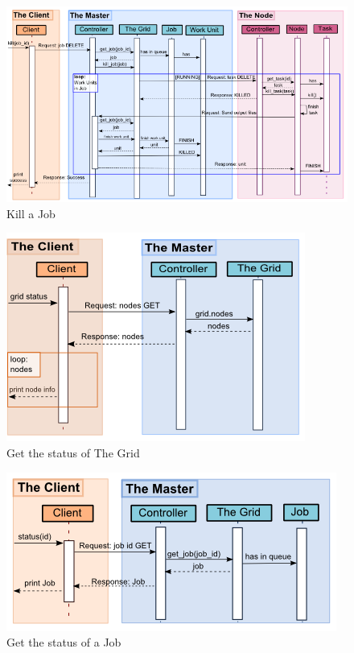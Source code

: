 \begin{figure}[htbp]
\centering
\includegraphics[keepaspectratio,width=\textwidth,height=0.75\textheight]{./figs/jobkill.png}
\caption{Kill a Job}
\end{figure}


\begin{figure}[htbp]
\centering
\includegraphics[keepaspectratio,width=\textwidth,height=0.75\textheight]{./figs/gridstatus.png}
\caption{Get the status of The Grid}
\end{figure}


\begin{figure}[htbp]
\centering
\includegraphics[keepaspectratio,width=\textwidth,height=0.75\textheight]{./figs/jobget.png}
\caption{Get the status of a Job}
\end{figure}


